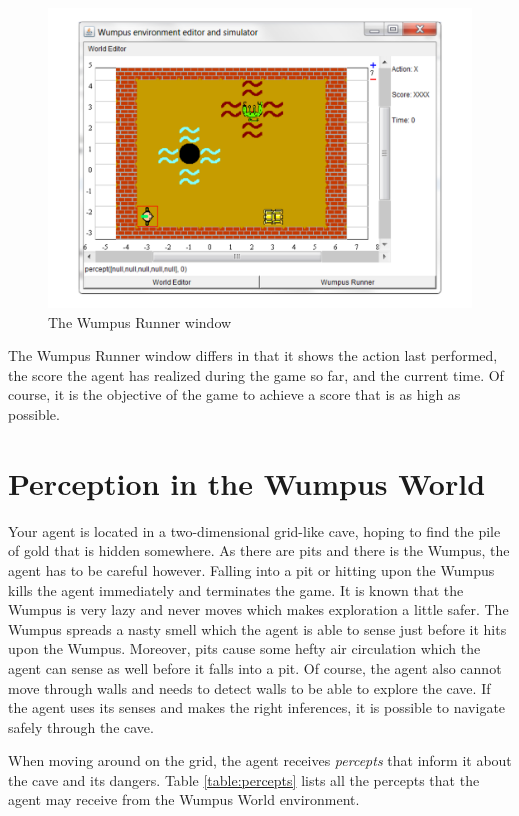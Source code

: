 \documentclass{article}
\begin{document}
\begin{figure}[h]
\centering
\includegraphics[width=12.5cm]{Figures/wumpusRunner.pdf}
\caption{The Wumpus Runner window}\label{fig:wumpusRunner}
\end{figure}

The Wumpus Runner window differs in that it shows the action last performed, the
score the agent has realized during the game so far, and the current time. Of
course, it is the objective of the game to achieve a score that is as high as
possible.


%
%
%
\section{Perception in the Wumpus World}
%

Your agent is located in a two-dimensional grid-like cave, hoping to
find the pile of gold that is hidden somewhere. As there are pits and
there is the Wumpus, the agent has to be careful however. Falling into a pit or
hitting upon the Wumpus kills the agent immediately and terminates the game. It is known that the
Wumpus is very lazy and never moves which makes exploration a little safer. The Wumpus spreads a nasty smell which
the agent is able to sense just before it hits upon the Wumpus. Moreover, pits
cause some hefty air circulation which the agent can sense as well before it
falls into a pit. Of course, the agent also cannot move through walls and needs to detect walls to be
able to explore the cave. If the agent uses its senses and makes the right inferences,
it is possible to navigate safely through the cave.

When moving around on the grid, the agent receives \textit{percepts} that inform
it about the cave and its dangers. Table \ref{table:percepts} lists all the
percepts that the agent may receive from the Wumpus World environment.
\end{document}
